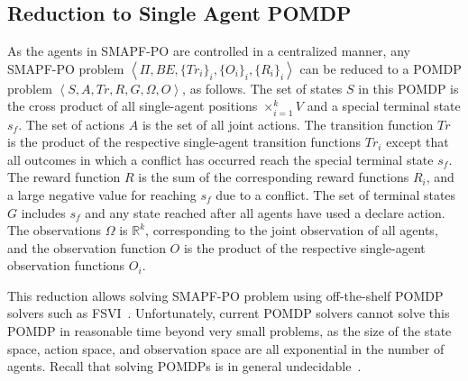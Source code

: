 \documentclass[letterpaper]{article} %
\newcommand{\tuple}[1]{\ensuremath{\left \langle #1 \right \rangle }}
\newcommand{\plan}[1]{{\textcolor{blue}{[Plan: #1]}}}
\newcommand{\inon}[1]{ }
\newcommand{\roni}[1]{ }
\begin{document}
\subsection{Reduction to Single Agent POMDP}
\label{sec:reduction}
As the agents in SMAPF-PO are controlled in a centralized manner, any SMAPF-PO problem $\tuple{\Pi,BE,\{Tr_i\}_i, \{O_i\}_i, \{R_i\}_i}$ can be reduced to a POMDP problem $\tuple{S,A,Tr,R,G,\Omega,O}$, as follows. 
The set of states $S$ in this POMDP 
is the cross product of all single-agent positions $\times_{i=1}^k V$ and a special terminal state $s_f$. 
The set of actions $A$ is the set of all joint actions. 
The transition function $Tr$ is the product of the respective single-agent transition functions $Tr_i$ except that all outcomes in which a conflict has occurred reach the special terminal state $s_f$. 
The reward function $R$ is the sum of the corresponding reward functions $R_i$, and a large negative value for reaching $s_f$ due to a conflict.  
The set of terminal states $G$ includes $s_f$ and any state reached after all agents have used a declare action. 
The observations $\Omega$ is $\mathbb{R}^k$, corresponding to the joint observation of all agents, and the observation function $O$ is the product of the respective single-agent observation functions $O_i$. 


This reduction allows solving SMAPF-PO problem using off-the-shelf POMDP solvers such as FSVI~\cite{shani2007forward}. 
Unfortunately, current POMDP solvers cannot solve this POMDP in reasonable time beyond very small problems, as the size of the state space, action space, and observation space are all exponential in the number of agents. Recall that solving POMDPs is in general undecidable~\cite{madani2003undecidability}. %

\end{document}
